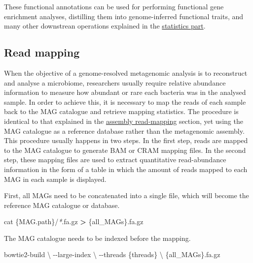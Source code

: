 \documentclass[
]{book}
\newenvironment{Shaded}{\begin{snugshade}}{\end{snugshade}}
\newcommand{\AttributeTok}[1]{\textcolor[rgb]{0.77,0.63,0.00}{#1}}
\newcommand{\DataTypeTok}[1]{\textcolor[rgb]{0.13,0.29,0.53}{#1}}
\newcommand{\ExtensionTok}[1]{#1}
\newcommand{\FunctionTok}[1]{\textcolor[rgb]{0.00,0.00,0.00}{#1}}
\newcommand{\NormalTok}[1]{#1}
\newcommand{\OperatorTok}[1]{\textcolor[rgb]{0.81,0.36,0.00}{\textbf{#1}}}
\newcommand{\PreprocessorTok}[1]{\textcolor[rgb]{0.56,0.35,0.01}{\textit{#1}}}
\begin{document}
These functional annotations can be used for performing functional gene enrichment analyses, distilling them into genome-inferred functional traits, and many other downstrean operations explained in the \protect\hyperlink{about-statistics}{statistics part}.

\hypertarget{genome-resolved-mapping}{%
\subsection*{Read mapping}\label{genome-resolved-mapping}}

When the objective of a genome-resolved metagenomic analysis is to reconstruct and analyse a microbiome, researchers usually require relative abundance information to measure how abundant or rare each bacteria was in the analysed sample. In order to achieve this, it is necessary to map the reads of each sample back to the MAG catalogue and retrieve mapping statistics. The procedure is identical to that explained in the \protect\hyperlink{assembly-read-mapping}{assembly read-mapping} section, yet using the MAG catalogue as a reference database rather than the metagenomic assembly. This procedure usually happens in two steps. In the first step, reads are mapped to the MAG catalogue to generate BAM or CRAM mapping files. In the second step, these mapping files are used to extract quantitative read-abundance information in the form of a table in which the amount of reads mapped to each MAG in each sample is displayed.

First, all MAGs need to be concatenated into a single file, which will become the reference MAG catalogue or database.

\begin{Shaded}
\begin{Highlighting}[]
\FunctionTok{cat}\NormalTok{ \{MAG.path\}/}\PreprocessorTok{*}\NormalTok{.fa.gz }\OperatorTok{\textgreater{}}\NormalTok{ \{all\_MAGs\}.fa.gz}
\end{Highlighting}
\end{Shaded}

The MAG catalogue needs to be indexed before the mapping.

\begin{Shaded}
\begin{Highlighting}[]
\ExtensionTok{bowtie2{-}build} \DataTypeTok{\textbackslash{}}
      \AttributeTok{{-}{-}large{-}index} \DataTypeTok{\textbackslash{}}
      \AttributeTok{{-}{-}threads}\NormalTok{ \{threads\} }\DataTypeTok{\textbackslash{}}
\NormalTok{       \{all\_MAGs\}.fa.gz}
\end{Highlighting}
\end{Shaded}
\end{document}
